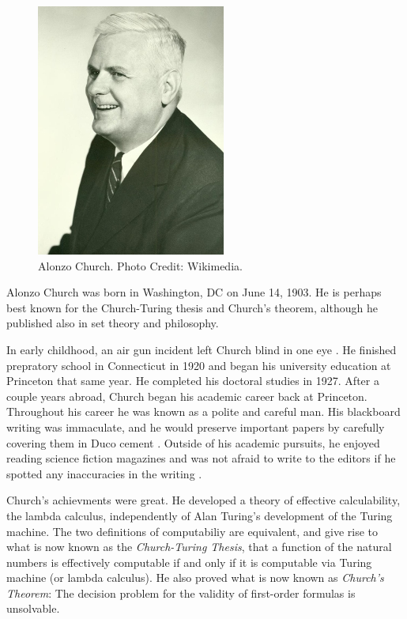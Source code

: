 \documentclass[../../../include/open-logic-section]{subfiles}
\begin{document}


\begin{figure}[h!]
\centering 
\includegraphics[scale=1]{alonzo-church.jpg} 
\caption{Alonzo
Church. Photo Credit: Wikimedia.} 
\end{figure}

Alonzo Church was born in Washington, DC on June 14, 1903. He is perhaps
best known for the Church-Turing thesis and Church's theorem, although he
published also in set theory and philosophy.
 
In early childhood, an air gun incident left Church blind in one eye
\citep[2]{EndertonND}. He finished prepratory school in Connecticut in
1920 and began his university education at Princeton that same year. He
completed his doctoral studies in 1927. After a couple years abroad, Church
began his academic career back at Princeton. Throughout his career he was
known as a polite and careful man. His blackboard writing was immaculate,
and he would preserve important papers by carefully covering them in Duco
cement \citep[4]{EndertonND}. Outside of his academic pursuits, he
enjoyed reading science fiction magazines and was not afraid to write to
the editors if he spotted any inaccuracies in the writing
\citep[5]{EndertonND}.

Church's achievments were great. He developed a theory of effective
calculability, the lambda calculus, independently of Alan Turing's
development of the Turing machine. The two definitions of computabiliy are
equivalent, and give rise to what is now known as the \emph{Church-Turing
Thesis}, that a function of the natural numbers is effectively computable
if and only if it is computable via Turing machine (or lambda calculus). He
also proved what is now known as \emph{Church's Theorem}: The decision
problem for the validity of first-order formulas is unsolvable.
\end{document}
